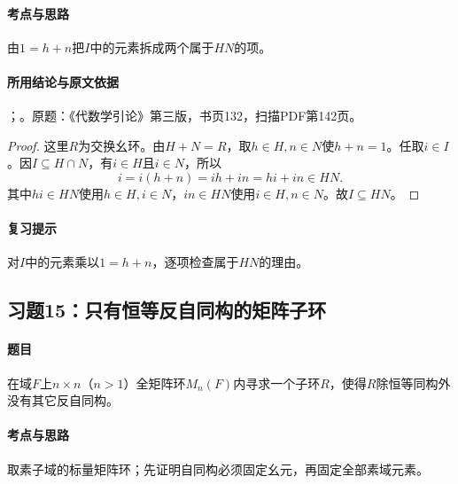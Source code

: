 \paragraph{考点与思路}

由$1=h+n$把$I$中的元素拆成两个属于$HN$的项。

\paragraph{所用结论与原文依据}

；。原题：《代数学引论》第三版，书页132，扫描PDF第142页。


\begin{proof}

这里$R$为交换幺环。由$H+N=R$，取$h\in H,n\in N$使$h+n=1$。任取$i\in I$。因$I\subseteq H\cap N$，有$i\in H$且$i\in N$，所以
\[
i=i(h+n)=ih+in=hi+in\in HN.
\]
其中$hi\in HN$使用$h\in H,i\in N$，$in\in HN$使用$i\in H,n\in N$。故$I\subseteq HN$。

\end{proof}

\paragraph{复习提示}

对$I$中的元素乘以$1=h+n$，逐项检查属于$HN$的理由。



\subsection{习题15：只有恒等反自同构的矩阵子环}

\label{ex:3:15}

\paragraph{题目}

在域$F$上$n\times n$（$n>1$）全矩阵环$M_n(F)$内寻求一个子环$R$，使得$R$除恒等同构外没有其它反自同构。

\paragraph{考点与思路}

取素子域的标量矩阵环；先证明自同构必须固定幺元，再固定全部素域元素。

